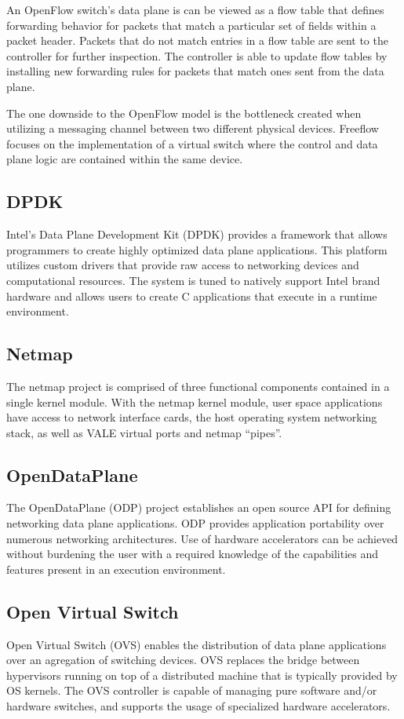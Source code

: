 An OpenFlow switch's data plane is can be viewed as a flow table that defines
forwarding behavior for packets that match a particular set of fields within
a packet header. Packets that do not match entries in a flow table are sent
to the controller for further inspection. The controller is able to update flow
tables by installing new forwarding rules for packets that match ones sent
from the data plane.

The one downside to the OpenFlow model is the bottleneck created when utilizing
a messaging channel between two different physical devices. Freeflow focuses
on the implementation of a virtual switch where the control and data plane
logic are contained within the same device.

\subsection{DPDK}
\label{related:dpdk}
Intel's Data Plane Development Kit (DPDK) \cite{dpdk} provides a framework that
allows programmers to create highly optimized data plane applications. This
platform utilizes custom drivers that provide raw access to networking devices
and computational resources. The system is tuned to natively support Intel
brand hardware and allows users to create C applications that execute in
a runtime environment.

\subsection{Netmap}
\label{related:netmap}
The netmap project \cite{netmap} is comprised of three functional components
contained in a single kernel module. With the netmap kernel module, user space
applications have access to network interface cards, the host operating system
networking stack, as well as VALE virtual ports and netmap ``pipes''.

\subsection{OpenDataPlane}
\label{related:odp}
The OpenDataPlane (ODP) project \cite{odp} establishes an open source API for
defining networking data plane applications. ODP provides application
portability over numerous networking architectures. Use of hardware
accelerators can be achieved without burdening the user with a required
knowledge of the capabilities and features present in an execution environment.

\subsection{Open Virtual Switch}
\label{related:ovs}
Open Virtual Switch (OVS) \cite{ovs} enables the distribution of data
plane applications over an agregation of switching devices. OVS replaces
the bridge between hypervisors running on top of a distributed machine that
is typically provided by OS kernels. The OVS controller is capable of managing
pure software and/or hardware switches, and supports the usage of specialized
hardware accelerators.

